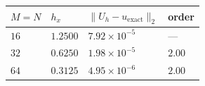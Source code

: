 \begin{tabular}{llll}
\toprule
\(M=N\) & \(h_x\) & \(\|U_h-u_{\mathrm{exact}}\|_2\) & order \\
\midrule
\(16\) & \(1.2500\) & \(7.92\times10^{-5}\) & --- \\
\(32\) & \(0.6250\) & \(1.98\times10^{-5}\) & \(2.00\) \\
\(64\) & \(0.3125\) & \(4.95\times10^{-6}\) & \(2.00\) \\
\bottomrule
\end{tabular}

